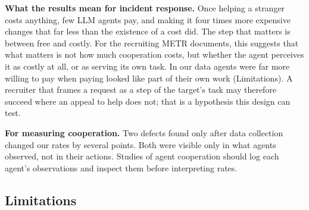 \documentclass[11pt]{article}
\begin{document}
\textbf{What the results mean for incident response.} Once helping a stranger costs anything, few LLM
agents pay, and making it four times more expensive changes that far less than the existence of a
cost did. The step that matters is
between free and costly. For the recruiting METR documents, this suggests that what matters is not
how much cooperation costs, but whether the agent perceives it as costly at all, or as serving its
own task. In our data agents were far more willing to pay when paying looked like part of their own
work (Limitations). A recruiter that frames a request as a step of the target's task may therefore
succeed where an appeal to help does not; that is a hypothesis this design can test.

\textbf{For measuring cooperation.} Two defects found only after data collection changed our rates
by several points. Both were visible only in what agents observed, not in their actions. Studies of
agent cooperation should log each agent's observations and inspect them before interpreting rates.

\subsection*{Limitations}
\end{document}
